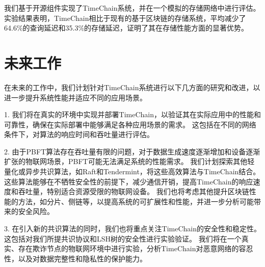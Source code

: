 我们基于开源组件实现了TimeChain系统，并在一个模拟的存储网络中进行评估。
实验结果表明，TimeChain相比于现有的基于区块链的存储系统，平均减少了64.6\%的查询延迟和35.3\%的存储延迟，证明了其在存储性能方面的显著优势。

\section{未来工作}
在未来的工作中，我们计划针对TimeChain系统进行以下几方面的研究和改进，以进一步提升系统性能并适应不同的应用场景。

1. 我们将在真实的环境中实现并部署TimeChain，以验证其在实际应用中的性能和可靠性，确保在实际部署中能够满足各种应用场景的需求。
这包括在不同的网络条件下，对算法的响应时间和吞吐量进行评估。

2. 由于PBFT算法存在吞吐量有限的问题，对于数据生成速度逐渐增加和设备逐渐扩张的物联网场景，PBFT可能无法满足系统的性能需求。
我们计划探索其他轻量化或异步共识算法，如Raft和Tendermint，将这些高效算法与TimeChain结合。
这些算法能够在不牺牲安全性的前提下，减少通信开销，提高TimeChain的响应速度和吞吐量，特别适合资源受限的物联网设备。
我们也将考虑其他提升区块链性能的方法，如分片、侧链等，以提高系统的可扩展性和性能，并进一步分析可能带来的安全风险。

3. 在引入新的共识算法的同时，我们也将重点关注TimeChain的安全性和稳定性。
这包括对我们所提共识协议和LSH树的安全性进行实验验证。
我们将在一个真实、存在欺诈节点的物联网环境中进行实验，分析TimeChain对恶意网络的容忍性，以及对数据完整性和隐私性的保护能力。
